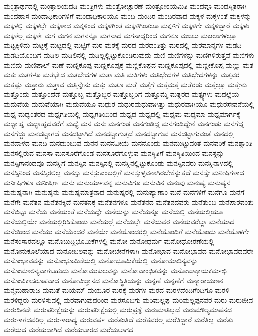 {ಮಂತ್ರಾರ್ಥದಲ್ಲಿ
ಮಂತ್ರಾಲಯದಡಿ
ಮಂತ್ರಿಗಳು
ಮಂತ್ರೋಚ್ಚಾರಣೆ
ಮಂತ್ರೋಽಯಮಿತಿ
ಮಂದವೂ
ಮಂದಸ್ಮಿತರಾಗಿ
ಮಂದಹಾಸ
ಮಂದಾಧಿಕಾರಿಗಳಿಗೆ
ಮಂದಾಧಿಕಾರಿಯೂ
ಮಂದಿ
ಮಂದಿರ
ಮಂದಿರವಾದ
ಮಕ್ಕಳ
ಮಕ್ಕಳಂತೆ
ಮಕ್ಕಳನ್ನು
ಮಕ್ಕಳಲ್ಲಿ
ಮಕ್ಕಳಲ್ಲೇ
ಮಕ್ಕಳಾದ
ಮಕ್ಕಳಿಂದ
ಮಕ್ಕಳಿಗಿಂತ
ಮಕ್ಕಳಿಗಿಂತಲೂ
ಮಕ್ಕಳಿಗೆ
ಮಕ್ಕಳಿಗೇ
ಮಕ್ಕಳಿದ್ದಾರೆ
ಮಕ್ಕಳು
ಮಕ್ಕಳೆಲ್ಲ
ಮಕ್ಕಳೇ
ಮಗ
ಮಗನ
ಮಗನನ್ನೂ
ಮಗನಾದ
ಮಗನಾದ್ದರಿಂದ
ಮಗನೂ
ಮಜಲು
ಮಜಲುಗಳಲ್ಲೂ
ಮಟ್ಟಕ್ಕಿಳಿದು
ಮಟ್ಟಕ್ಕೆ
ಮಟ್ಟದಲ್ಲಿ
ಮಟ್ಟಿಗೆ
ಮಠ
ಮಠಕ್ಕೆ
ಮಠದ
ಮಠದಂತಿತ್ತು
ಮಠದಲ್ಲಿ
ಮಠಮಾನ್ಯಗಳ
ಮಡದಿ
ಮಡದಿಯೊಂದಿಗೆ
ಮಡಿಲ
ಮಡಿಲಿನಲ್ಲಿ
ಮಡಿಲ್ಲಲ್ಲಿಟ್ಟುಕೊಂಡಿರುವುದು
ಮಣಿ
ಮಣಿಗಳನ್ನು
ಮಣಿಗಳಿರುತ್ತವೆ
ಮಣಿಗಳು
ಮಣಿದು
ಮಣಿಪಾಲ್
ಮಣೆ
ಮಣ್ಣಿಕೊಪ್ಪ
ಮಣ್ಣಿಕೊಪ್ಪಕ್ಕೆ
ಮಣ್ಣಿಕೊಪ್ಪದ
ಮಣ್ಣಿಕೊಪ್ಪದಲ್ಲಿ
ಮಣ್ಣೀಕೊಪ್ಪ
ಮಣ್ಣು
ಮತ
ಮತಃ
ಮತಗಳೂ
ಮತಭೇದ
ಮತಭೇದಗಳ
ಮತಾ
ಮತಿ
ಮತಿಗಳು
ಮತಿಭೇದಗಳ
ಮತಿಭೇದಗಳನ್ನು
ಮತ್ತವರ
ಮತ್ತಷ್ಟು
ಮತ್ತಾರು
ಮತ್ತಾವ
ಮತ್ತಿನ್ನೇನು
ಮತ್ತು
ಮತ್ತೂ
ಮತ್ತೆ
ಮತ್ತೆಗೆ
ಮತ್ತೆಮತ್ತೆ
ಮತ್ತೆರಡು
ಮತ್ತೆಲ್ಲೂ
ಮತ್ತೇನು
ಮತ್ತೊಂದು
ಮತ್ತೊಂದೆಡೆ
ಮತ್ತೊಬ್ಬ
ಮತ್ತೊಬ್ಬರ
ಮತ್ತೊಬ್ಬರಿಗೆ
ಮತ್ತೊಮ್ಮೆ
ಮತ್ಸರದ
ಮತ್ಸ್ಯಗಳು
ಮದಲ್ಲೆಯ
ಮದುವೆಯ
ಮದುವೆಯಾಗಿ
ಮದುವೆಯೂ
ಮಧುರ
ಮಧುರಮಧುವಾಗಿತ್ತು
ಮಧುರವಾಗಿಯೂ
ಮಧುರಸೇವನೆಯಲ್ಲಿ
ಮಧ್ಯ
ಮಧ್ಯಂತರದ
ಮಧ್ಯಗತಿಯಲ್ಲಿ
ಮಧ್ಯಗತಿಯಿಂದ
ಮಧ್ಯದ
ಮಧ್ಯದಲ್ಲಿ
ಮಧ್ಯಮ
ಮಧ್ಯಮಾ
ಮಧ್ಯಮಾರ್ಗಕ್ಕೆ
ಮಧ್ಯಾಹ್ನ
ಮಧ್ಯಾಹ್ನದವರೆಗೆ
ಮಧ್ಯೆ
ಮನ
ಮನಃ
ಮನಗಂಡ
ಮನಗಂಡಿದ್ದ
ಮನಗಂಡಿದ್ದೇನೆ
ಮನಗಂಡು
ಮನಗೆದ್ದ
ಮನಗೆದ್ದು
ಮನದಟ್ಟಾಗದೆ
ಮನದಟ್ಟಾಗಿದೆ
ಮನದಟ್ಟಾಗುತ್ತದೆ
ಮನದಟ್ಟಾಗುವ
ಮನದಟ್ಟಾಗುವಂತೆ
ಮನದಲ್ಲಿ
ಮನದಾಳದ
ಮನದಿ
ಮನದುಂಬುವ
ಮನನ
ಮನನವೀಯೆ
ಮನನೊಂದು
ಮನಮುಟ್ಟುವಂತೆ
ಮನವರಿಕೆ
ಮನಶ್ಶಾಂತಿ
ಮನಸಲ್ಲಿರುವ
ಮನಸಾ
ಮನಸೂರೆಗೊಂಡ
ಮನಸೂರೆಗೊಳ್ಳುವ
ಮನಸ್ಥಿತಿಗೆ
ಮನಸ್ಥಿತಿಯಿಂದ
ಮನಸ್ಸನ್ನು
ಮನಸ್ಸಿಗಾನಂದವೂ
ಮನಸ್ಸಿಗೆ
ಮನಸ್ಸಿನ
ಮನಸ್ಸಿನಲ್ಲಿ
ಮನಸ್ಸಿನಲ್ಲಿಟ್ಟುಕೊಂಡು
ಮನಸ್ಸಿನವರು
ಮನಸ್ಸಿನಾಳದಲ್ಲಿ
ಮನಸ್ಸಿನಿಂದ
ಮನಸ್ಸಿರಲಿಲ್ಲ
ಮನಸ್ಸು
ಮನಸ್ಸುಎಂಬಲ್ಲಿಗೆ
ಮನಸ್ಸುಳ್ಳವನಾಗಿರಬೇಕೆನ್ನುತ್ತದೆ
ಮನಸ್ಸೇ
ಮನೀಷಿಗಳಾದ
ಮನೀಷಿಗಳೂ
ಮನೀಷಿಣಃ
ಮನು
ಮನುರ್ಯಾವನ್ನ
ಮನುವಿಗೂ
ಮನುವಿನ
ಮನುವು
ಮನುಷ್ಯ
ಮನುಷ್ಯನ
ಮನುಷ್ಯನಾಗಿ
ಮನುಷ್ಯನು
ಮನುಷ್ಯಮಾತ್ರನಾದ
ಮನುಷ್ಯರಲ್ಲಿ
ಮನುಷ್ಯಾಣಾಂ
ಮನೆ
ಮನೆಗಳಿಗೆ
ಮನೆಗೂ
ಮನೆಗೆ
ಮನೆಗೇ
ಮನೆತನ
ಮನೆತನಕ್ಕಿದೆ
ಮನೆತನಕ್ಕೆ
ಮನೆತನಗಳೂ
ಮನೆತನದ
ಮನೆತನದವರು
ಮನೆತುಂಬ
ಮನೆಪಾಠವಂತು
ಮನೆಬಿಟ್ಟು
ಮನೆಯ
ಮನೆಯಂತೆ
ಮನೆಯದ್ದೇ
ಮನೆಯನ್ನು
ಮನೆಯನ್ನೂ
ಮನೆಯಲ್ಲಿ
ಮನೆಯಲ್ಲಿಯೂ
ಮನೆಯಲ್ಲಿಯೇ
ಮನೆಯಲ್ಲಿರಿಸಿಕೊಂಡು
ಮನೆಯಲ್ಲೆ
ಮನೆಯಲ್ಲೇ
ಮನೆಯವರ
ಮನೆಯವರೆಲ್ಲಾ
ಮನೆಯಾದ
ಮನೆಯಿಂದ
ಮನೆಯು
ಮನೆಯೆಂದರೆ
ಮನೆಯೇ
ಮನೆಯೊಂದರಲ್ಲಿ
ಮನೆಯೊಂದಿಗೆ
ಮನೆಯೊಂದು
ಮನೆಯೊಳಗೇ
ಮನೆಸಂಸಾರದಲ್ಲೂ
ಮನೊಬುದ್ಧಿಭೂಮಿಕೆಗಳಲ್ಲಿ
ಮನೋ
ಮನೋಧರ್ಮ
ಮನೋಧೋರಣೆಯಲ್ಲಿ
ಮನೋನುಕೂಲೆಯಾದ
ಮನೋಬಲವನ್ನು
ಮನೋಬೇನೆಗಳಾಗಿ
ಮನೋಭಾವ
ಮನೋಭಾವದ
ಮನೋಭಾವದವರೇ
ಮನೋಭಾವವನ್ನು
ಮನೋಭೂಮಿಕೆಯಲ್ಲಿ
ಮನೋಭೂಮಿಕೆಯೆಲ್ಲಿ
ಮನೋಮಾಲಿನ್ಯವನ್ನು
ಮನೋಮಾಲಿನ್ಯವಾಗಬಹುದು
ಮನೋಮುಕುಲವನ್ನು
ಮನೋವಾಂಛಿತವನ್ನು
ಮನೋವಾಕ್ಕಾಯಕರ್ಮಭಿಃ
ಮನೋವಿಕಾಸರೂಪವಾದ
ಮನೋವಿಜ್ಞಾನದ
ಮನೋಸ್ಥಿತಿಯನ್ನು
ಮನ್ನಣೆ
ಮನ್ನಣೆಗೆ
ಮನ್ನಾರಾಯಣನ
ಮನ್ಮಮಹಾರಾಜ
ಮಮತೆ
ಮಯಮ್
ಮಯೂರ
ಮರಕ್ಕೆ
ಮರಗಳ
ಮರದ
ಮರಳದೆಂದಿಗೆಂದಿಗೂ
ಮರಳಿ
ಮರಳಿದ್ದರು
ಮರಳಿಸುವಲ್ಲಿ
ಮರವಾಗುವುದರಿಂದ
ಮರಸೊಬಗು
ಮರಿಮಲ್ಲಪ್ಪ
ಮರಿಮಲ್ಲಪ್ಪನವರ
ಮರು
ಮರುಜೀವ
ಮರುದಿನವೇ
ಮರುಪರೀಕ್ಷೆಯನ್ನು
ಮರುಪರೀಕ್ಷೆಯಲ್ಲಿ
ಮರುಪ್ರಶ್ನೆ
ಮರುಮಾತಿಲ್ಲದೆ
ಮರುಮೌಲ್ಯಮಾಪನದ
ಮರುಳಾಗದವರಿಲ್ಲ
ಮರುಳಾರಾಧ್ಯ
ಮರುವರ್ಷ
ಮರೆತಂತಿದೆ
ಮರೆತವರಲ್ಲ
ಮರೆತಿದ್ದಾರೆ
ಮರೆತಿಲ್ಲ
ಮರೆತು
ಮರೆಯದ
ಮರೆಯದಾಗಿದೆ
ಮರೆಯಬಾರದ
ಮರೆಯಲಾಗದ
}
